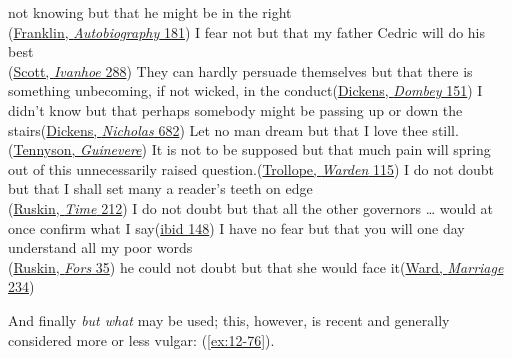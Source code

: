 \ex
not knowing but that he might be in the right\\\hfill(\href{https://archive.org/details/benjaminfrautobio00franrich/page/326/mode/2up?q=%22not+knowing+but+that%22&view=theater}{Franklin, \textit{Autobiography} 181})
\ex
I fear not but that my father Cedric will do his best\\\hfill(\href{https://archive.org/details/scottsivanhoeedi0000amar/page/342/mode/2up?q=%22fear+not+but+that%22&view=theater}{Scott, \textit{Ivanhoe} 288}) %
\ex
They can hardly persuade themselves but that there is something unbecoming, if not wicked, in the conduct\hfill(\href{https://archive.org/details/dombeyson00dick_0/page/240/mode/2up?q=%22something+unbecoming%22&view=theater}{Dickens, \textit{Dombey} 151}) %
\ex
I didn't know but that perhaps somebody might be passing up or down the stairs\hfill(\href{https://archive.org/details/lifeadventuresofdickrich/page/608/mode/2up?q=%22perhaps+somebody+might%22&view=theater}{Dickens, \textit{Nicholas} 682}) %
\ex
Let no man dream but that I love thee still.\hfill(\href{https://en.wikisource.org/wiki/Idylls_of_the_King/Guinevere}{Tennyson, \textit{Guinevere}})
\ex
It is not to be supposed but that much pain will spring out of this unnecessarily raised question.\hfill(\href{https://archive.org/details/warden0000anth_w6p5/page/108/mode/2up?q=%22but+that+much+pain%22&view=theater}{Trollope, \textit{Warden} 115}) %
\ex
I do not doubt but that I shall set many a reader's teeth on edge\\\hfill(\href{https://archive.org/details/afs9348.0001.001.umich.edu/page/191/mode/2up?view=theater&q=%22do+not+doubt+but%22}{Ruskin, \textit{Time} 212})
\ex
I do not doubt but that all the other governors {\dots} would at once confirm what I say\hfill(\href{https://archive.org/details/afs9348.0001.001.umich.edu/page/135/mode/2up?view=theater&q=%22do+not+doubt+but+that%22}{ibid 148}) %
\ex
I have no fear but that you will one day understand all my poor words\\\hfill(\href{https://archive.org/details/forsclavigeralet12rusk/page/n63/mode/2up?view=theater&q=%22fear+but+that+you%22}{Ruskin, \textit{Fors} 35})
\ex
he could not doubt but that she would face it\hfill(\href{https://archive.org/details/marriageofwillia0000mrsh_i0u5/page/276/mode/2up?q=%22he+could+not+doubt%22&view=theater}{Ward, \textit{Marriage} 234})
\z
\z

And finally \textit{but what} may be used; this, however, is recent and generally considered more or less vulgar: (\ref{ex:12-76}).

